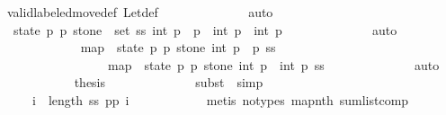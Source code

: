 \begin{isabellebody}
\ valid{\isacharunderscore}labeled{\isacharunderscore}move{\isacharprime}{\isacharunderscore}def\ Let{\isacharunderscore}def\isanewline
\ \ \ \ \ \ \ \ \ \ \ \ \isamarkupfalse%
\ auto\isanewline
\ \ \ \ \ \ \ \ \ \ \isamarkupfalse%
\ {\isachardoublequoteopen}{\isasymforall}\ {\isacharparenleft}state{\isacharcomma}\ p{}{\isacharcomma}\ p{}{\isacharcomma}\ stone{\isacharparenright}\ {\isasymin}\ set\ ss{\isachardot}\ int\ {\isacharparenleft}p{}\ {\isacharminus}\ p{}{\isacharparenright}\ {\isacharequal}\ int\ p{}\ {\isacharminus}\ int\ p{}{\isachardoublequoteclose}\isanewline
\ \ \ \ \ \ \ \ \ \ \ \ \isamarkupfalse%
\ auto\isanewline
\ \ \ \ \ \ \ \ \ \ \isamarkupfalse%
\ {\isacharasterisk}{\isacharcolon}\ {\isachardoublequoteopen}map\ {\isacharparenleft}{\isasymlambda}\ {\isacharparenleft}state{\isacharcomma}\ p{}{\isacharcomma}\ p{}{\isacharcomma}\ stone{\isacharparenright}{\isachardot}\ int\ {\isacharparenleft}p{}\ {\isacharminus}\ p{}{\isacharparenright}{\isacharparenright}\ ss\ {\isacharequal}\ \isanewline
\ \ \ \ \ \ \ \ \ \ \ \ \ \ \ \ \ map\ {\isacharparenleft}{\isasymlambda}\ {\isacharparenleft}state{\isacharcomma}\ p{}{\isacharcomma}\ p{}{\isacharcomma}\ stone{\isacharparenright}{\isachardot}\ int\ p{}\ {\isacharminus}\ int\ p{}{\isacharparenright}\ ss{\isachardoublequoteclose}\isanewline
\ \ \ \ \ \ \ \ \ \ \ \ \isamarkupfalse%
\ auto\isanewline
\ \ \ \ \ \ \ \ \ \ \isamarkupfalse%
\ {\isacharquery}thesis\isanewline
\ \ \ \ \ \ \ \ \ \ \ \ \isamarkupfalse%
\ {\isacharparenleft}subst\ {\isacharasterisk}{\isacharcomma}\ simp{\isacharparenright}\isanewline
\ \ \ \ \ \ \ \ \isamarkupfalse%
\isanewline
\ \ \ \ \ \ \ \ \isamarkupfalse%
\ \isamarkupfalse%
\ {\isachardoublequoteopen}{\isachardot}{\isachardot}{\isachardot}\ {\isacharequal}\ \ {\isacharparenleft}{\isasymSum}\ i\ {\isasymleftarrow}\ {\isacharbrackleft}{}{\isachardot}{\isachardot}{\isacharless}length\ ss{\isacharbrackright}{\isachardot}\ {\isacharquery}p{}p{}\ i{\isacharparenright}{\isachardoublequoteclose}\isanewline
\ \ \ \ \ \ \ \ \ \ \isamarkupfalse%
\ {\isacharparenleft}metis\ {\isacharparenleft}no{\isacharunderscore}types{\isacharparenright}\ map{\isacharunderscore}nth\ sum{\isacharunderscore}list{\isacharunderscore}comp{\isacharparenright}\isanewline

\end{isabellebody}

